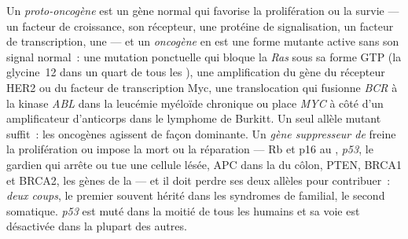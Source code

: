 \begin{definition}\label{def:b3:cancer-biology:genes}
Un \emph{proto-oncogène} est un gène normal qui favorise la
prolifération ou la survie --- un facteur de croissance, son récepteur,
une protéine de signalisation, un facteur de transcription, une 
--- et un \emph{oncogène} en est une forme mutante active sans son
signal normal~: une mutation ponctuelle qui bloque la 
\emph{Ras} sous sa forme GTP (la glycine~12 dans un quart de tous les
), une amplification du gène du récepteur HER2 ou du facteur de
transcription Myc, une translocation qui fusionne \emph{BCR} à la
kinase \emph{ABL} dans la leucémie myéloïde chronique ou place
\emph{MYC} à côté d'un amplificateur d'anticorps dans le lymphome de
Burkitt. Un seul allèle mutant suffit~: les oncogènes agissent de façon
dominante. Un \emph{gène suppresseur de } freine la prolifération
ou impose la mort ou la réparation --- Rb et p16 au , \emph{p53}, le gardien qui arrête ou tue une cellule
lésée, APC dans la  du côlon, PTEN, BRCA1 et BRCA2, les gènes
de la  --- et il doit perdre ses deux
allèles pour contribuer~: \emph{deux coups}, le premier souvent hérité
dans les syndromes de  familial, le second somatique. \emph{p53}
est muté dans la moitié de tous les  humains et sa voie est
désactivée dans la plupart des autres.
\end{definition}

